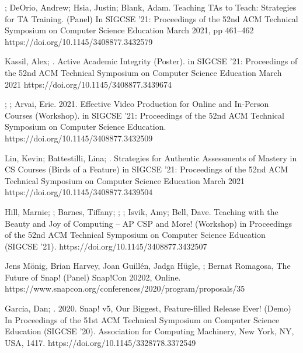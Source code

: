 \begin{etaremune}
    \item{\me; DeOrio, Andrew; Hsia, Justin; Blank, Adam. Teaching TAs to Teach: Strategies for TA Training. (Panel) In SIGCSE '21: Proceedings of the 52nd ACM Technical Symposium on Computer Science Education March 2021, pp 461–462
    \newline
    https://doi.org/10.1145/3408877.3432579
    }

    \item{Kassil, Alex; \me. Active Academic Integrity (Poster).
    in SIGCSE '21: Proceedings of the 52nd ACM Technical Symposium on Computer Science Education March 2021 https://doi.org/10.1145/3408877.3439674
    }

    \item \me; \dan; Arvai, Eric. 2021. Effective Video Production for Online and In-Person Courses (Workshop). in SIGCSE '21: Proceedings of the 52nd ACM Technical Symposium on Computer Science Education.
    \newline
    https://doi.org/10.1145/3408877.3432509
    
    \item{Lin, Kevin; Battestilli, Lina; \me. Strategies for Authentic Assessments of Mastery in CS Courses (Birds of a Feature) in SIGCSE '21: Proceedings of the 52nd ACM Technical Symposium on Computer Science Education March 2021
    \newline
    https://doi.org/10.1145/3408877.3439504}
    
    \item{Hill, Marnie; \dan; Barnes, Tiffany; \lauren; \me; Isvik, Amy; Bell, Dave. Teaching with the Beauty and Joy of Computing – AP CSP and More! (Workshop) in Proceedings of the 52nd ACM Technical Symposium on Computer Science Education (SIGCSE '21).
    \newline
    https://doi.org/10.1145/3408877.3432507}
    
    \item{Jens Mönig, Brian Harvey, Joan Guillén, Jadga Hügle, \me; Bernat Romagosa, The Future of Snap! (Panel) Snap!Con 20202, Online.
    \newline
    https://www.snapcon.org/conferences/2020/program/proposals/35
    }
    
    \item{Garcia, Dan; \me. 2020. Snap! v5, Our Biggest, Feature-filled Release Ever! (Demo) In Proceedings of the 51st ACM Technical Symposium on Computer Science Education (SIGCSE '20). Association for Computing Machinery, New York, NY, USA, 1417. https://doi.org/10.1145/3328778.3372549}
    

\end{etaremune}
